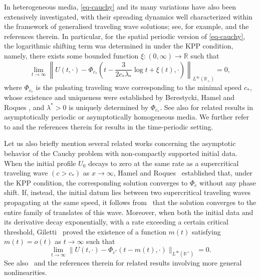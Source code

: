 \documentclass[11pt]{amsart}
\numberwithin{equation}{section}
\begin{document}
In heterogeneous media, \eqref{eq-cauchy} and its many  variations have also been extensively investigated, with their spreading dynamics well characterized within the framework of generalised traveling wave solutions; see, for example, \cite{GF, wein02, HR11, LYZ,shen11,HR15,shen10} and the references therein.
In particular, for the spatial periodic version of \eqref{eq-cauchy}, the logarithmic shifting term was determined in \cite{HNRR16} under  the KPP  condition, namely, there exists  some bounded  function \( \xi : (0,\infty) \to \mathbb{R} \)  such that
\begin{equation*}
\lim_{t \to \infty} 
\left\| 
U(t,\cdot) - \Phi_{c_*}\!\left( t - \frac{3}{2c_* \lambda_*} \log t + \xi(t), \cdot \right)
\right\|_{L^\infty(\mathbb R_+)} 
= 0,
\end{equation*}
where \( \Phi_{c_*} \) is the pulsating traveling wave corresponding to the minimal speed \( c_* \), whose existence and uniqueness were established by
 Berestycki, Hamel and Roques \cite{BHR05}, and $\lambda^*>0$ is uniquely determined by $\Phi_{c_*}$. See also   \cite{G14, D15} for related results in asymptotically periodic or asymptotically homogeneous media. We further refer to \cite{HR15, N099, shen10,LYZ} and the references therein for results in the time-periodic setting. 

Let us also  briefly mention several related works concerning the asymptotic behavior of the Cauchy problem with non-compactly supported initial data. When the initial profile \( U_0 \) decays to zero at the same rate as a supercritical traveling wave $(c>c_*)$ as \( x \to \infty \), Hamel and Roques~\cite{HR11} established that, under the KPP condition, the corresponding solution converges to \( \Phi_c \) without any phase shift. 
If, instead, the initial datum lies between two supercritical traveling waves propagating at the same speed, it follows from~\cite{BMR} that the solution converges to the entire family of translates of this wave. 
Moreover, when both the initial data and its derivative decay exponentially, with a rate exceeding a certain critical threshold, Giletti~\cite{G14} proved the existence of a function \( m(t) \) satisfying \( m(t) = o(t) \) as \( t \to \infty \) such that
\begin{equation}\label{eq-up}
\lim_{t\to\infty} \|U(t,\cdot) - \Phi_{c^*}(t - m(t), \cdot)\|_{L^\infty(\mathbb{R}^+)} = 0.
\end{equation}
See also~\cite{ducrot,DM20,DM2,P20} and the references therein for related results involving more general nonlinearities.
\end{document}
